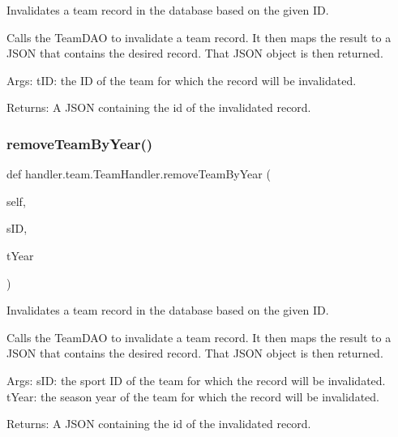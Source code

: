 \begin{DoxyVerb}Invalidates a team record in the database based on the given ID.

Calls the TeamDAO to invalidate a team record. It then
maps the result to a JSON that contains the desired record. That JSON 
object is then returned.

Args:
    tID: the ID of the team for which the  record will be invalidated.
    
Returns:
    A JSON containing the id of the invalidated record.
\end{DoxyVerb}
 \mbox{\label{classhandler_1_1team_1_1_team_handler_a9edec7a490cd154b7d4033badb1fdacf}} 
\subsubsection{\texorpdfstring{remove\+Team\+By\+Year()}{removeTeamByYear()}}
{\footnotesize\ttfamily def handler.\+team.\+Team\+Handler.\+remove\+Team\+By\+Year (\begin{DoxyParamCaption}\item[{}]{self,  }\item[{}]{s\+ID,  }\item[{}]{t\+Year }\end{DoxyParamCaption})}

\begin{DoxyVerb}Invalidates a team record in the database based on the given ID.

Calls the TeamDAO to invalidate a team record. It then
maps the result to a JSON that contains the desired record. That JSON 
object is then returned.

Args:
    sID: the sport ID of the team for which the  record will be invalidated.
    tYear: the season year of the team for which the  record will be invalidated.
    
Returns:
    A JSON containing the id of the invalidated record.
\end{DoxyVerb}
 \mbox{\label{classhandler_1_1team_1_1_team_handler_aac0d812b5de7f390f36d12590429df95}} 
